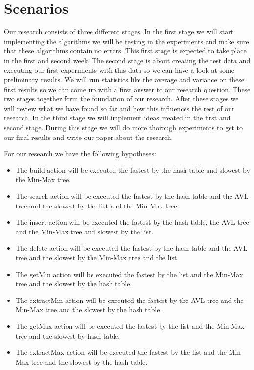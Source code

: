 \documentclass{article}
\begin{document}
\section{Scenarios}
Our research consists of three different stages. In the first stage we will start implementing the algorithms we will be testing in the experiments and make sure that these algorithms contain no errors. This first stage is expected to take place in the first and second week. The second stage is about creating the test data and executing our first experiments with this data so we can have a look at some preliminary results. We will run statistics like the average and variance on these first results so we can come up with a first answer to our research question. These two stages together form the foundation of our research. After these stages we will review what we have found so far and how this influences the rest of our research. In the third stage we will implement ideas created in the first and second stage. During this stage we will do more thorough experiments to get to our final results and write our paper about the research.


For our research we have the following hypotheses:
\begin{itemize}
\item The build action will be executed the fastest by the hash table and slowest by the Min-Max tree.
\item The search action will be executed the fastest by the hash table and the AVL tree and the slowest by the list and the Min-Max tree.
\item The insert action will be executed the fastest by the hash table, the AVL tree and the Min-Max tree and slowest by the list.
\item The delete action will be executed the fastest by the hash table and the AVL tree and the slowest by the Min-Max tree and the list.
\item The getMin action will be executed the fastest by the list and the Min-Max tree and the slowest by the hash table.
\item The extractMin action will be executed the fastest by the AVL tree and the Min-Max tree and the slowest by the hash table.
\item The getMax action will be executed the fastest by the list and the Min-Max tree and the slowest by hash table.
\item The extractMax action will be executed the fastest by the list and the Min-Max tree and the slowest by the hash table.
\end{itemize}
\end{document}
